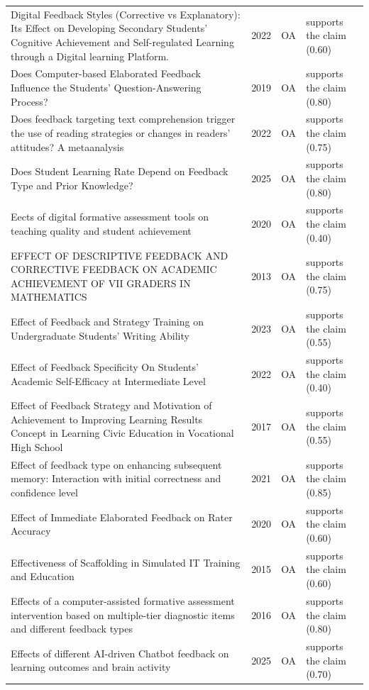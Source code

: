 \begin{longtable}{@{}%
  >{\raggedright\arraybackslash}p{}c%
  >{\raggedright\arraybackslash}p{}%
  >{\raggedright\arraybackslash}p{}@{}}
Digital Feedback Styles (Corrective vs Explanatory): Its Effect on Developing Secondary Students' Cognitive Achievement and Self-regulated Learning through a Digital learning Platform. & 2022 & OA & supports the claim (0.60) \\
Does Computer-based Elaborated Feedback Influence the Students' Question-Answering Process? & 2019 & OA & supports the claim (0.80) \\
Does feedback targeting text comprehension trigger the use of reading strategies or changes in readers' attitudes? A metaanalysis & 2022 & OA & supports the claim (0.75) \\
Does Student Learning Rate Depend on Feedback Type and Prior Knowledge? & 2025 & OA & supports the claim (0.80) \\
Eects of digital formative assessment tools on teaching quality and student achievement & 2020 & OA & supports the claim (0.40) \\
EFFECT OF DESCRIPTIVE FEEDBACK AND CORRECTIVE FEEDBACK ON ACADEMIC ACHIEVEMENT OF VII GRADERS IN MATHEMATICS & 2013 & OA & supports the claim (0.75) \\
Effect of Feedback and Strategy Training on Undergraduate Students' Writing Ability & 2023 & OA & supports the claim (0.55) \\
Effect of Feedback Specificity On Students' Academic Self-Efficacy at Intermediate Level & 2022 & OA & supports the claim (0.40) \\
Effect of Feedback Strategy and Motivation of Achievement to Improving Learning Results Concept in Learning Civic Education in Vocational High School & 2017 & OA & supports the claim (0.55) \\
Effect of feedback type on enhancing subsequent memory: Interaction with initial correctness and confidence level & 2021 & OA & supports the claim (0.85) \\
Effect of Immediate Elaborated Feedback on Rater Accuracy & 2020 & OA & supports the claim (0.60) \\
Effectiveness of Scaffolding in Simulated IT Training and Education & 2015 & OA & supports the claim (0.60) \\
Effects of a computer-assisted formative assessment intervention based on multiple-tier diagnostic items and different feedback types & 2016 & OA & supports the claim (0.80) \\
Effects of different AI-driven Chatbot feedback on learning outcomes and brain activity & 2025 & OA & supports the claim (0.70) \\

\end{longtable}
